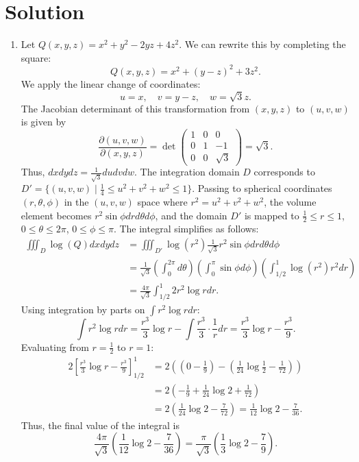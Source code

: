 \documentclass[10pt,a4paper]{article}
\begin{document}
\section*{Solution}
\begin{enumerate}[label=\fbox{\arabic*}]
  \item %
        Let $Q(x,y,z) = x^2 + y^2 - 2yz + 4z^2$. We can rewrite this by completing the square:
        \[
          Q(x,y,z) = x^2 + (y-z)^2 + 3z^2.
        \]
        We apply the linear change of coordinates:
        \[
          u = x, \quad v = y - z, \quad w = \sqrt{3}z.
        \]
        The Jacobian determinant of this transformation from $(x, y, z)$ to $(u, v, w)$ is given by
        \[
          \frac{\partial(u,v,w)}{\partial(x,y,z)} = \det \begin{pmatrix} 1 & 0 & 0 \\ 0 & 1 & -1 \\ 0 & 0 & \sqrt{3} \end{pmatrix} = \sqrt{3}.
        \]
        Thus, $dx dy dz = \frac{1}{\sqrt{3}} du dv dw$. The integration domain $D$ corresponds to $D' = \{ (u,v,w) \mid \frac{1}{4} \le u^2 + v^2 + w^2 \le 1 \}$.
        Passing to spherical coordinates $(r, \theta, \phi)$ in the $(u, v, w)$ space where $r^2 = u^2 + v^2 + w^2$, the volume element becomes $r^2 \sin \phi dr d\theta d\phi$, and the domain $D'$ is mapped to $\frac{1}{2} \le r \le 1$, $0 \le \theta \le 2\pi$, $0 \le \phi \le \pi$.
        The integral simplifies as follows:
        \begin{align*}
          \iiint_D \log(Q) dx dy dz &= \iiint_{D'} \log(r^2) \frac{1}{\sqrt{3}} r^2 \sin\phi dr d\theta d\phi \\
          &= \frac{1}{\sqrt{3}} \left( \int_0^{2\pi} d\theta \right) \left( \int_0^\pi \sin\phi d\phi \right) \left( \int_{1/2}^1 \log(r^2) r^2 dr \right) \\
          &= \frac{4\pi}{\sqrt{3}} \int_{1/2}^1 2r^2 \log r dr.
        \end{align*}
        Using integration by parts on $\int r^2 \log r dr$:
        \[
          \int r^2 \log r dr = \frac{r^3}{3} \log r - \int \frac{r^3}{3} \cdot \frac{1}{r} dr = \frac{r^3}{3} \log r - \frac{r^3}{9}.
        \]
        Evaluating from $r = \frac{1}{2}$ to $r = 1$:
        \begin{align*}
          2 \left[ \frac{r^3}{3} \log r - \frac{r^3}{9} \right]_{1/2}^1 &= 2 \left( \left( 0 - \frac{1}{9} \right) - \left( \frac{1}{24} \log \frac{1}{2} - \frac{1}{72} \right) \right) \\
          &= 2 \left( -\frac{1}{9} + \frac{1}{24} \log 2 + \frac{1}{72} \right) \\
          &= 2 \left( \frac{1}{24} \log 2 - \frac{7}{72} \right) = \frac{1}{12} \log 2 - \frac{7}{36}.
        \end{align*}
        Thus, the final value of the integral is
        \[
          \frac{4\pi}{\sqrt{3}} \left( \frac{1}{12} \log 2 - \frac{7}{36} \right) = \frac{\pi}{\sqrt{3}} \left( \frac{1}{3} \log 2 - \frac{7}{9} \right).
        \]


\end{enumerate}
\end{document}
